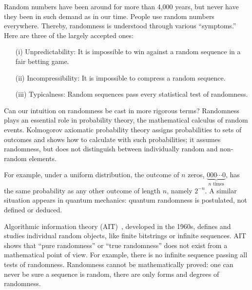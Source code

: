 \documentclass{mscs}
\begin{document}
Random numbers have been around for more than 4,000 years, but never have they been in such demand as in our time. People use random numbers everywhere.
Thereby, randomness is understood through various ``symptoms.'' Here are three of the largely accepted ones:
\begin{enumerate}
\item[(i)]
{Unpredictability:} It is impossible to win against a random sequence in a fair betting game.
\item[(ii)]
{Incompressibility:}  It is impossible to  compress a random sequence.
\item[(iii)]
{Typicalness:} Random sequences pass every  statistical test of randomness.
\end{enumerate}

Can our intuition on randomness be cast in more rigorous terms? Randomness plays an essential role in probability theory, the mathematical calculus of random events. Kolmogorov axiomatic probability theory assigns probabilities to sets of outcomes and  shows how to calculate with such probabilities;   it assumes randomness, but does not distinguish between individually random and non-random elements.

For example, under a uniform distribution, the outcome of $n$ zeros,
$\underbrace{000\cdots 0}_{n\text{ times}}$,
has the same probability as any other outcome of length $n$, namely $2^{-n}$. A similar situation appears in quantum mechanics: quantum randomness is postulated, not defined or deduced.

Algorithmic information theory (AIT)~\citep{ch6}, developed in the 1960s, defines and studies individual random objects, like finite bitstrings or infinite sequences.
AIT shows that ``pure randomness'' or ``true randomness'' does not exist from a
mathematical point of view.
For example, there is no infinite sequence passing all tests of randomness.
Randomness cannot be mathematically proved: one can never be sure a sequence is random, there are only forms and degrees of randomness.
\end{document}
